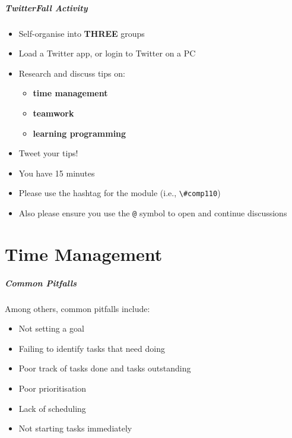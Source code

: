 \begin{frame}
	\frametitle{TwitterFall Activity}
		
	\begin{itemize}
		\item Self-organise into \textbf{THREE} groups
		\item Load a Twitter app, or login to Twitter on a PC
		\item Research and discuss tips on:
		\begin{itemize}			 
			\item \textbf{time management}
			\item \textbf{teamwork}
			\item \textbf{learning programming}
		\end{itemize}
		\item Tweet your tips!
	\end{itemize}

	\begin{itemize}
		\item You have 15 minutes
		\item Please use the hashtag for the module (i.e., \lstinline{\#comp110})
		\item Also please ensure you use the \lstinline{@} symbol to open and continue discussions
	\end{itemize}
\end{frame}

\part{Time Management}
\frame{\partpage}

\begin{frame}
	\frametitle{Common Pitfalls}
	
	Among others, common pitfalls include:
	
	\begin{itemize}
		\item Not setting a goal
		\item Failing to identify tasks that need doing
		\item Poor track of tasks done and tasks outstanding
		\item Poor prioritisation
		\item Lack of scheduling
		\item Not starting tasks immediately
	\end{itemize}

\end{frame}

